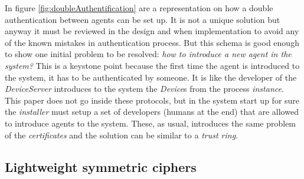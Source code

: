 \documentclass[10pt,a4paper,twoside]{llncs}
\begin{document}
In figure \ref{fig:doubleAuthentification} are a representation on how a double authentication between agents can be set up. It is not a unique solution but anyway it must be reviewed in the design and when implementation to avoid any of the known mistakes in authentication process. But this schema is good enough to show one initial problem to be resolved: \emph{how to introduce a new agent in the system?} This is a keystone point because the first time the agent is introduced to the system, it has to be authenticated by someone. It is like the developer of the \emph{DeviceServer} introduces to the system the \emph{Device}s from the process \emph{instance}. This paper does not go inside these protocols, but in the system start up for sure the \emph{installer} must setup a set of developers (humans at the end) that are allowed to introduce agents to the system. These, as usual, introduces the same problem of the \emph{certificates} and the solution can be similar to a \emph{trust ring}.

\subsection{Lightweight symmetric ciphers}\label{sec:encryption}

\end{document}

